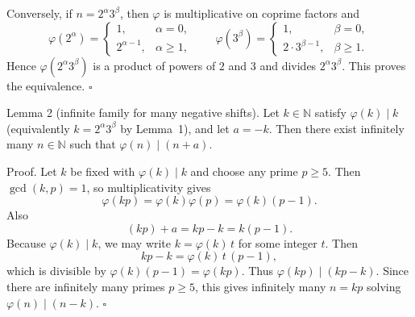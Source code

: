 Conversely, if $n=2^\alpha 3^\beta$, then $\varphi$ is multiplicative on coprime factors and
\[
\varphi(2^\alpha)=\begin{cases}1,&\alpha=0,\\2^{\alpha-1},&\alpha\ge1,\end{cases}
\qquad
\varphi(3^\beta)=\begin{cases}1,&\beta=0,\\2\cdot 3^{\beta-1},&\beta\ge1.\end{cases}
\]
Hence $\varphi(2^\alpha 3^\beta)$ is a product of powers of $2$ and $3$ and divides $2^\alpha 3^\beta$.
This proves the equivalence. $\square$

Lemma 2 (infinite family for many negative shifts).
Let $k\in\mathbb{N}$ satisfy $\varphi(k)\mid k$ (equivalently $k=2^\alpha 3^\beta$ by Lemma~1), and let $a=-k$.
Then there exist infinitely many $n\in\mathbb{N}$ such that $\varphi(n)\mid (n+a)$.

Proof.
Let $k$ be fixed with $\varphi(k)\mid k$ and choose any prime $p\ge5$.
Then $\gcd(k,p)=1$, so multiplicativity gives
\[
\varphi(kp)=\varphi(k)\varphi(p)=\varphi(k)(p-1).
\]
Also
\[
(kp)+a = kp-k = k(p-1).
\]
Because $\varphi(k)\mid k$, we may write $k=\varphi(k)\,t$ for some integer $t$.
Then
\[
kp-k = \varphi(k)\,t\,(p-1),
\]
which is divisible by $\varphi(k)(p-1)=\varphi(kp)$.
Thus $\varphi(kp)\mid (kp-k)$.
Since there are infinitely many primes $p\ge5$, this gives infinitely many $n=kp$ solving $\varphi(n)\mid (n-k)$.
$\square$

